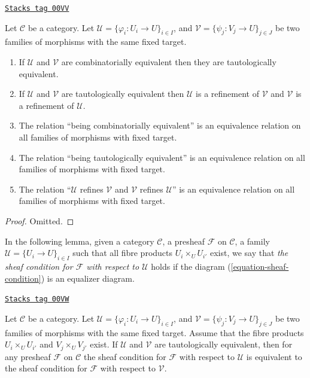\begin{lemma}
\label{sites-lemma-tautological-combinatorial}
\href{https://stacks.math.columbia.edu/tag/00VV}{\texttt{Stacks tag 00VV}}

Let $\mathcal{C}$ be a category.
Let $\mathcal{U} = \{\varphi_i : U_i \to U\}_{i\in I}$, and
$\mathcal{V} = \{\psi_j : V_j \to U\}_{j\in J}$ be two families of morphisms
with the same fixed target.
\begin{enumerate}
\item If $\mathcal{U}$ and $\mathcal{V}$ are combinatorially equivalent
then they are tautologically equivalent.
\item If $\mathcal{U}$ and $\mathcal{V}$ are tautologically equivalent
then $\mathcal{U}$ is a refinement of $\mathcal{V}$ and
$\mathcal{V}$ is a refinement of $\mathcal{U}$.
\item The relation ``being combinatorially equivalent'' is an
equivalence relation on all families of morphisms with fixed target.
\item The relation ``being tautologically equivalent'' is an
equivalence relation on all families of morphisms with fixed target.
\item The relation ``$\mathcal{U}$ refines $\mathcal{V}$ and
$\mathcal{V}$ refines $\mathcal{U}$'' is an equivalence relation on
all families of morphisms with fixed target.
\end{enumerate}
\end{lemma}

\begin{proof}
Omitted.
\end{proof}

In the following lemma, given a category $\mathcal{C}$, a presheaf
$\mathcal{F}$  on $\mathcal{C}$, a
family $\mathcal{U} = \{U_i \to U\}_{i\in I}$ such that
all fibre products $U_i \times_U U_{i'}$ exist, we say that
{\it the sheaf condition for $\mathcal{F}$ with respect to
$\mathcal{U}$} holds if the diagram (\ref{equation-sheaf-condition})
is an equalizer diagram.

\begin{lemma}
\label{sites-lemma-tautological-same-sheaf}
\href{https://stacks.math.columbia.edu/tag/00VW}{\texttt{Stacks tag 00VW}}

Let $\mathcal{C}$ be a category. Let
$\mathcal{U} = \{\varphi_i : U_i \to U\}_{i\in I}$, and
$\mathcal{V} = \{\psi_j : V_j \to U\}_{j\in J}$ be two families of morphisms
with the same fixed target. Assume that the fibre products
$U_i \times_U U_{i'}$ and $V_j \times_U V_{j'}$ exist.
If $\mathcal{U}$ and $\mathcal{V}$ are
tautologically equivalent, then for any presheaf $\mathcal{F}$ on
$\mathcal{C}$ the sheaf condition for $\mathcal{F}$ with respect to
$\mathcal{U}$ is equivalent to the sheaf condition for $\mathcal{F}$
with respect to $\mathcal{V}$.
\end{lemma}

